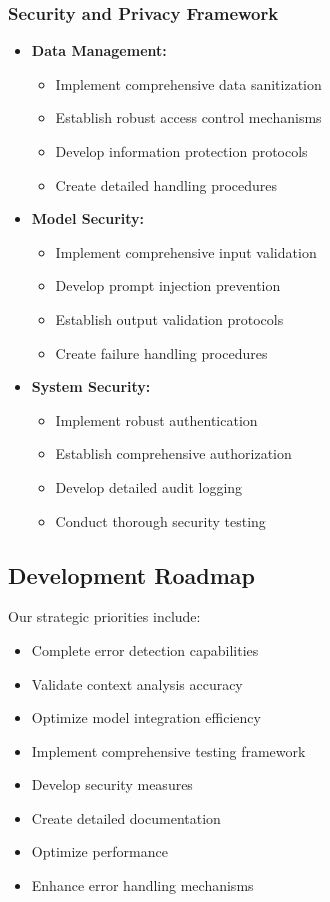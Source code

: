 \subsubsection{Security and Privacy Framework}
\begin{itemize}
    \item \textbf{Data Management:}
        \begin{itemize}
            \item Implement comprehensive data sanitization
            \item Establish robust access control mechanisms
            \item Develop information protection protocols
            \item Create detailed handling procedures
        \end{itemize}
    \item \textbf{Model Security:}
        \begin{itemize}
            \item Implement comprehensive input validation
            \item Develop prompt injection prevention
            \item Establish output validation protocols
            \item Create failure handling procedures
        \end{itemize}
    \item \textbf{System Security:}
        \begin{itemize}
            \item Implement robust authentication
            \item Establish comprehensive authorization
            \item Develop detailed audit logging
            \item Conduct thorough security testing
        \end{itemize}
\end{itemize}

\subsection{Development Roadmap}
Our strategic priorities include:
\begin{itemize}
    \item Complete error detection capabilities
    \item Validate context analysis accuracy
    \item Optimize model integration efficiency
    \item Implement comprehensive testing framework
    \item Develop security measures
    \item Create detailed documentation
    \item Optimize performance
    \item Enhance error handling mechanisms
\end{itemize}

